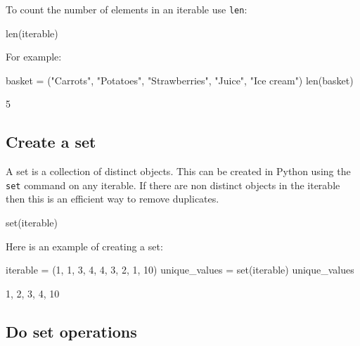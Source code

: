 To count the number of elements in an iterable use \texttt{len}:


\begin{pyin}
len(iterable)
\end{pyin}



For example:




\begin{pyin}
basket = ("Carrots", "Potatoes", "Strawberries", "Juice", "Ice cream")
len(basket)
\end{pyin}





\begin{raw}
5
\end{raw}





\subsection{Create a set}
\label{\detokenize{building-tools/02-functions-and-data-structures/how/main:create-a-set}}

A set is a collection of distinct objects. This can be created in Python using
the \texttt{set} command on any iterable. If there are non distinct objects in the
iterable then this is an efficient way to remove duplicates.


\begin{pyin}
set(iterable)
\end{pyin}



Here is an example of creating a set:




\begin{pyin}
iterable = (1, 1, 3, 4, 4, 3, 2, 1, 10)
unique_values = set(iterable)
unique_values
\end{pyin}





\begin{raw}
{1, 2, 3, 4, 10}
\end{raw}





\subsection{Do set operations}
\label{\detokenize{building-tools/02-functions-and-data-structures/how/main:do-set-operations}}

